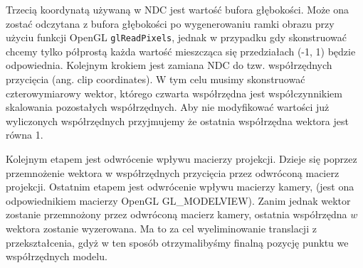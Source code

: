 Trzecią koordynatą używaną w NDC jest wartość bufora głębokości. Może ona zostać
odczytana z bufora głębokości po wygenerowaniu ramki obrazu przy użyciu funkcji
OpenGL \texttt{glReadPixels}, jednak w przypadku gdy skonstruować chcemy tylko
półprostą każda wartość mieszcząca się przedziałach (-1, 1) będzie odpowiednia.
Kolejnym krokiem jest zamiana NDC do tzw. współrzędnych przycięcia (ang. clip
		coordinates). W tym celu musimy skonstruować czterowymiarowy wektor,
		 którego czwarta współrzędna jest współczynnikiem skalowania pozostałych
		 współrzędnych. Aby nie modyfikować wartości już wyliczonych
		 współrzędnych przyjmujemy że ostatnia współrzędna wektora jest równa 1.
		 
Kolejnym etapem jest odwrócenie wpływu macierzy projekcji. Dzieje się
poprzez przemnożenie wektora w współrzędnych przycięcia przez odwróconą
macierz projekcji. Ostatnim etapem jest odwrócenie wpływu macierzy
kamery, (jest ona odpowiednikiem macierzy OpenGL GL\_MODELVIEW).
Zanim jednak wektor zostanie przemnożony przez odwróconą macierz kamery,
	  ostatnia współrzędna $w$ wektora zostanie wyzerowana. Ma to za cel
	  wyeliminowanie translacji z przekształcenia, gdyż w ten sposób
	  otrzymalibyśmy finalną pozycję punktu we współrzędnych modelu.


